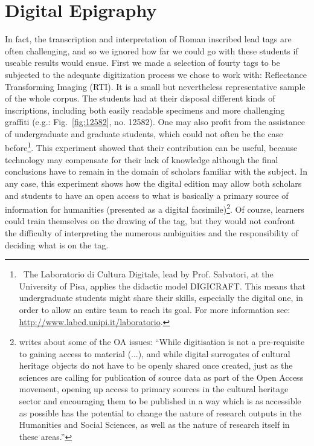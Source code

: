 \documentclass[amsthm,ebook]{saparticle}
\begin{document}
\section{Digital Epigraphy}


\noindent In fact, the transcription and interpretation of Roman inscribed lead tags are often challenging, and so we ignored how
far we could go with these students if useable results would ensue. First we made a selection of fourty tags to be
subjected to the adequate digitization process we chose to work with: Reflectance Transforming Imaging (RTI). It is a
small but nevertheless representative sample of the whole corpus. The students had at their disposal different kinds of
inscriptions, including both easily readable specimens and more challenging graffiti (e.g.: Fig.~\ref{fig:12582}, no. 12582). One may also
profit from the assistance of undergraduate and graduate students, which could not often be the case
before\footnote{\ The Laboratorio di Cultura Digitale, lead by Prof. Salvatori, at the University of Pisa, applies the
didactic model DIGICRAFT. This means that undergraduate students might share their skills, especially the digital one,
in order to allow an entire team to reach its goal. For more information see: \url{http://www.labcd.unipi.it/laboratorio}.}.
This experiment showed that their contribution can be useful, because technology may compensate for their lack of
knowledge although the final conclusions have to remain in the domain of scholars familiar with the subject. In any
case, this experiment shows how the digital edition may allow both scholars and students to have an open access to what
is basically a primary source of information for humanities (presented as a digital facsimile)\footnote{\citet{gorman_opening_2015}
writes about some of the OA issues: ``While digitisation is not a pre-requisite to gaining access to material (...), and
while digital surrogates of cultural heritage objects do not have to be openly shared once created, just as the
sciences are calling for publication of source data as part of the Open Access movement, opening up access to primary
sources in the cultural heritage sector and encouraging them to be published in a way which is as accessible as
possible has the potential to change the nature of research outputs in the Humanities and Social Sciences, as well as
the nature of research itself in these areas.''}. Of course, learners could train themselves on the drawing of the tag,
but they would not confront the difficulty of interpreting the numerous ambiguities and the responsibility of deciding
what is on the tag. 
\end{document}
